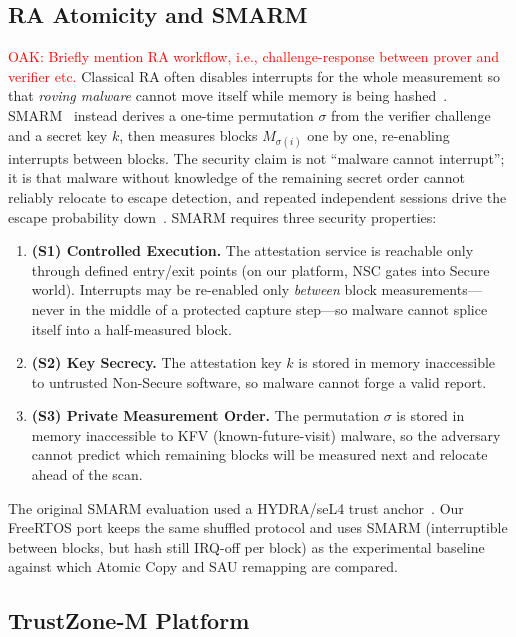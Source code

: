 \documentclass[conference]{IEEEtran}
\newcommand\oak[1]{\textcolor{red}{OAK: #1}}
\begin{document}
\subsection{RA Atomicity and SMARM}

\oak{Briefly mention RA workflow, i.e., challenge-response between prover and verifier etc.}
Classical RA often disables interrupts for the whole measurement so that
\emph{roving malware} cannot move itself while memory is being
hashed~\cite{eldefrawy2012smart,nunes2019vrased}.
SMARM~\cite{carpent2018smarm} instead derives a one-time permutation
$\sigma$ from the verifier challenge and a secret key $k$, then measures
blocks $M_{\sigma(i)}$ one by one, re-enabling interrupts between
blocks. The security claim is not ``malware cannot interrupt''; it is
that malware without knowledge of the remaining secret order cannot
reliably relocate to escape detection, and repeated independent sessions
drive the escape probability down~\cite{carpent2018smarm}.
SMARM requires three security properties:
\begin{enumerate}
  \item \textbf{(S1) Controlled Execution.}
    The attestation service is reachable only through defined
    entry/exit points (on our platform, NSC gates into Secure
    world). Interrupts may be re-enabled only
    \emph{between} block measurements---never in the middle of a
    protected capture step---so malware cannot splice itself into a
    half-measured block.
  \item \textbf{(S2) Key Secrecy.}
    The attestation key $k$ is stored in memory inaccessible to
    untrusted Non-Secure software, so malware cannot forge a valid
    report.
  \item \textbf{(S3) Private Measurement Order.}
    The permutation $\sigma$ is stored in memory inaccessible to
    KFV (known-future-visit) malware, so the adversary cannot
    predict which remaining blocks will be measured next and relocate
    ahead of the scan.
\end{enumerate}
The original SMARM evaluation used a HYDRA/seL4 trust
anchor~\cite{eldefrawy2017hydra,carpent2018smarm}. Our FreeRTOS port
keeps the same shuffled protocol and uses SMARM (interruptible between
blocks, but hash still IRQ-off per block) as the experimental baseline
against which Atomic Copy and SAU remapping are compared.

\subsection{TrustZone-M Platform}
\end{document}
